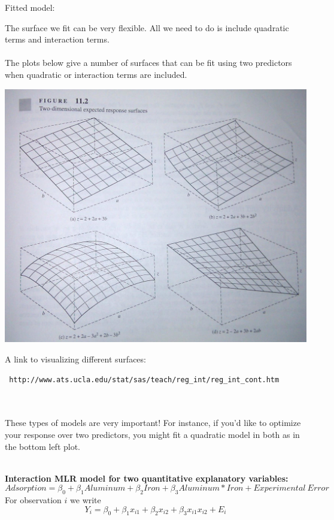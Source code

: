 Fitted model:
\newpage

The surface we fit can be very flexible.  All we need to do is include quadratic terms and interaction terms.\\~\\
The plots below give a number of surfaces that can be fit using two predictors when quadratic or interaction terms are included.
\begin{center}
\includegraphics[scale=0.3]{surfaces}
\end{center}

A link to visualizing different surfaces:  \begin{verbatim} http://www.ats.ucla.edu/stat/sas/teach/reg_int/reg_int_cont.htm \end{verbatim}~\\~\\

These types of models are very important!  For instance, if you'd like to optimize your response over two predictors, you might fit a quadratic model in both as in the bottom left plot.\\~\\


\newpage

\Large\textbf{Interaction MLR model for two quantitative explanatory variables:}\large\\
$$Adsorption = \beta_0+\beta_1Aluminum+\beta_2Iron+\beta_3Aluminum*Iron+Experimental~Error$$
For observation $i$ we write 
$$Y_i = \beta_0 + \beta_1 x_{i1} + \beta_2 x_{i2} + \beta_3x_{i1}x_{i2}+E_{i}$$

